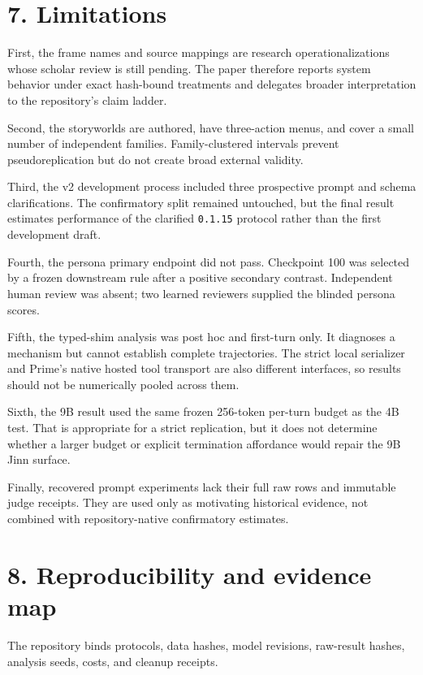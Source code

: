 \documentclass[
  11pt,
  letterpaper,
]{article}
\begin{document}
\section{7. Limitations}\label{limitations}

First, the frame names and source mappings are research
operationalizations whose scholar review is still pending. The paper
therefore reports system behavior under exact hash-bound treatments and
delegates broader interpretation to the repository's claim ladder.

Second, the storyworlds are authored, have three-action menus, and cover
a small number of independent families. Family-clustered intervals
prevent pseudoreplication but do not create broad external validity.

Third, the v2 development process included three prospective prompt and
schema clarifications. The confirmatory split remained untouched, but
the final result estimates performance of the clarified \texttt{0.1.15}
protocol rather than the first development draft.

Fourth, the persona primary endpoint did not pass. Checkpoint 100 was
selected by a frozen downstream rule after a positive secondary
contrast. Independent human review was absent; two learned reviewers
supplied the blinded persona scores.

Fifth, the typed-shim analysis was post hoc and first-turn only. It
diagnoses a mechanism but cannot establish complete trajectories. The
strict local serializer and Prime's native hosted tool transport are
also different interfaces, so results should not be numerically pooled
across them.

Sixth, the 9B result used the same frozen 256-token per-turn budget as
the 4B test. That is appropriate for a strict replication, but it does
not determine whether a larger budget or explicit termination affordance
would repair the 9B Jinn surface.

Finally, recovered prompt experiments lack their full raw rows and
immutable judge receipts. They are used only as motivating historical
evidence, not combined with repository-native confirmatory estimates.

\section{8. Reproducibility and evidence
map}\label{reproducibility-and-evidence-map}

The repository binds protocols, data hashes, model revisions, raw-result
hashes, analysis seeds, costs, and cleanup receipts.
\end{document}
